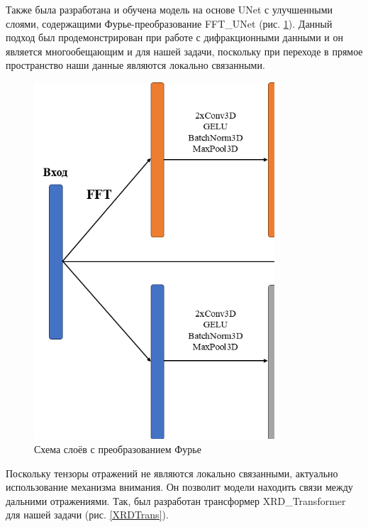 Также была разработана и обучена модель на основе UNet с улучшенными слоями, содержащими Фурье-преобразование FFT\_UNet (рис. \ref{fft_unet}). Данный подход был продемонстрирован \cite{yang_hionet_2023} при работе с дифракционными данными и он является многообещающим и для нашей задачи, поскольку при переходе в прямое пространство наши данные являются локально связанными.


\begin{figure}[H]
    \centering
    \includegraphics[width=0.8\textwidth]{figures/fft_arch.png}
    \caption{Схема слоёв с преобразованием Фурье}
    \label{fft_unet}
\end{figure}

Поскольку тензоры отражений не являются локально связанными, актуально использование механизма внимания. Он позволит модели находить связи между дальними отражениями. Так, был разработан трансформер XRD\_Transformer для нашей задачи (рис. \ref{XRDTrans}). 

